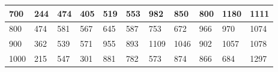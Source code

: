\documentclass[10pt,letterpaper]{article}
\begin{document}
\begin{center}
\begin{table}
\begin{tabular} { |m{0.5cm}|m{1.3cm}|m{1.3cm}|m{1.3cm}|m{1.3cm}|m{1.3cm}|m{1.3cm}|m{1.3cm}|m{1.3cm}|m{1.3cm}|m{1.3cm}|}
\hline
\cellcolor{Gray}700 & \Large 244 & \Large 474 & \Large 405 & \Large 519 & \Large 553 & \Large 982 & \Large 850 & \Large 800 & \Large 1180 & \Large 1111 \\
\hline
\cellcolor{Gray}800 & \Large 474 & \Large 581 & \Large 567 & \Large 645 & \Large 587 & \Large 753 & \Large 672 & \Large 966 & \Large 970 & \Large 1074 \\
\hline
\cellcolor{Gray}900 & \Large 362 & \Large 539 & \Large 571 & \Large 955 & \Large 893 & \Large 1109 & \Large 1046 & \Large 902 & \Large 1057 & \Large 1078 \\
\hline
\cellcolor{Gray}1000 & \Large 215 & \Large 547 & \Large 301 & \Large 881 & \Large 782 & \Large 573 & \Large 874 & \Large 866 & \Large 684 & \Large 1297 \\
\hline
\end{tabular} \\
\end{table}
\end{center}
\newpage 
{}
\end{document}
